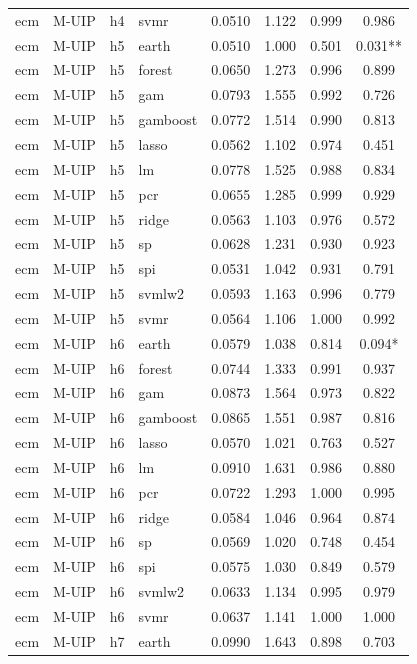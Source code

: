 \begin{ThreePartTable}
\begin{longtable}[t]{llclcccc}
ecm & M-UIP & h4 & svmr & 0.0510 & 1.122 & 0.999 & 0.986\\
\addlinespace
ecm & M-UIP & h5 & earth & 0.0510 & 1.000 & 0.501 & 0.031**\\
ecm & M-UIP & h5 & forest & 0.0650 & 1.273 & 0.996 & 0.899\\
ecm & M-UIP & h5 & gam & 0.0793 & 1.555 & 0.992 & 0.726\\
ecm & M-UIP & h5 & gamboost & 0.0772 & 1.514 & 0.990 & 0.813\\
ecm & M-UIP & h5 & lasso & 0.0562 & 1.102 & 0.974 & 0.451\\
ecm & M-UIP & h5 & lm & 0.0778 & 1.525 & 0.988 & 0.834\\
ecm & M-UIP & h5 & pcr & 0.0655 & 1.285 & 0.999 & 0.929\\
ecm & M-UIP & h5 & ridge & 0.0563 & 1.103 & 0.976 & 0.572\\
ecm & M-UIP & h5 & sp & 0.0628 & 1.231 & 0.930 & 0.923\\
ecm & M-UIP & h5 & spi & 0.0531 & 1.042 & 0.931 & 0.791\\
ecm & M-UIP & h5 & svmlw2 & 0.0593 & 1.163 & 0.996 & 0.779\\
ecm & M-UIP & h5 & svmr & 0.0564 & 1.106 & 1.000 & 0.992\\
\addlinespace
ecm & M-UIP & h6 & earth & 0.0579 & 1.038 & 0.814 & 0.094*\\
ecm & M-UIP & h6 & forest & 0.0744 & 1.333 & 0.991 & 0.937\\
ecm & M-UIP & h6 & gam & 0.0873 & 1.564 & 0.973 & 0.822\\
ecm & M-UIP & h6 & gamboost & 0.0865 & 1.551 & 0.987 & 0.816\\
ecm & M-UIP & h6 & lasso & 0.0570 & 1.021 & 0.763 & 0.527\\
ecm & M-UIP & h6 & lm & 0.0910 & 1.631 & 0.986 & 0.880\\
ecm & M-UIP & h6 & pcr & 0.0722 & 1.293 & 1.000 & 0.995\\
ecm & M-UIP & h6 & ridge & 0.0584 & 1.046 & 0.964 & 0.874\\
ecm & M-UIP & h6 & sp & 0.0569 & 1.020 & 0.748 & 0.454\\
ecm & M-UIP & h6 & spi & 0.0575 & 1.030 & 0.849 & 0.579\\
ecm & M-UIP & h6 & svmlw2 & 0.0633 & 1.134 & 0.995 & 0.979\\
ecm & M-UIP & h6 & svmr & 0.0637 & 1.141 & 1.000 & 1.000\\
\addlinespace
ecm & M-UIP & h7 & earth & 0.0990 & 1.643 & 0.898 & 0.703\\

\end{longtable}
\end{ThreePartTable}
